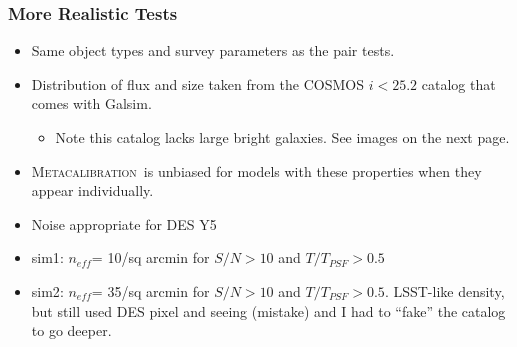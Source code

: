 \documentclass{beamer}
\newcommand{\Mcal}{\textsc{Metacalibration}}
\newcommand{\neff}{$n_{eff}$}
\begin{document}
\frame
{
    \frametitle{More Realistic Tests}

 
    \begin{itemize}

        \item Same object types and survey parameters as the pair tests.

        \item Distribution of flux and size taken from the COSMOS $i<25.2$ catalog
            that comes with Galsim.
            \begin{itemize}
                \item Note this catalog lacks large bright galaxies. See images
                    on the next page.
            \end{itemize}

        \item \Mcal\ is unbiased for models with these properties when they
            appear individually.

        \item Noise appropriate for DES Y5

        \item {\color{lightsteelblue} sim1}: \neff={\color{green} 10}/sq arcmin for $S/N > 10$ and $T/T_{PSF} > 0.5$
            
        \item {\color{lightsteelblue} sim2}: \neff={\color{brightred} 35}/sq arcmin for $S/N > 10$ and $T/T_{PSF} > 0.5$.
            LSST-like density, but still used DES pixel and seeing (mistake)
            and I had to ``fake'' the catalog to go deeper.


    \end{itemize}

}
\end{document}

